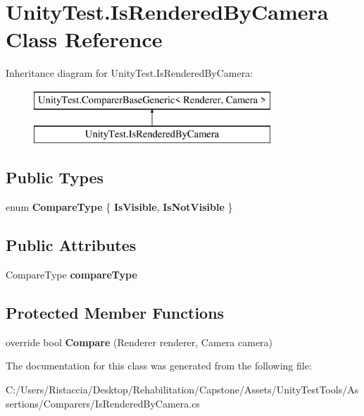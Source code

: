\hypertarget{class_unity_test_1_1_is_rendered_by_camera}{}\section{Unity\+Test.\+Is\+Rendered\+By\+Camera Class Reference}
\label{class_unity_test_1_1_is_rendered_by_camera}
Inheritance diagram for Unity\+Test.\+Is\+Rendered\+By\+Camera\+:\begin{figure}[H]
\begin{center}
\leavevmode
\includegraphics[height=2.000000cm]{class_unity_test_1_1_is_rendered_by_camera}
\end{center}
\end{figure}
\subsection*{Public Types}
\begin{DoxyCompactItemize}
\item 
\mbox{\label{class_unity_test_1_1_is_rendered_by_camera_a0ee826daaf714b366b7cae7874af3fe1}} 
enum {\bfseries Compare\+Type} \{ {\bfseries Is\+Visible}, 
{\bfseries Is\+Not\+Visible}
 \}
\end{DoxyCompactItemize}
\subsection*{Public Attributes}
\begin{DoxyCompactItemize}
\item 
\mbox{\label{class_unity_test_1_1_is_rendered_by_camera_add4ce0e6c9dee388ed787734cfc90267}} 
Compare\+Type {\bfseries compare\+Type}
\end{DoxyCompactItemize}
\subsection*{Protected Member Functions}
\begin{DoxyCompactItemize}
\item 
\mbox{\label{class_unity_test_1_1_is_rendered_by_camera_a1f882f618dacf240a4b7c17f2f8a12d2}} 
override bool {\bfseries Compare} (Renderer renderer, Camera camera)
\end{DoxyCompactItemize}


The documentation for this class was generated from the following file\+:\begin{DoxyCompactItemize}
\item 
C\+:/\+Users/\+Ristaccia/\+Desktop/\+Rehabilitation/\+Capstone/\+Assets/\+Unity\+Test\+Tools/\+Assertions/\+Comparers/Is\+Rendered\+By\+Camera.\+cs\end{DoxyCompactItemize}
